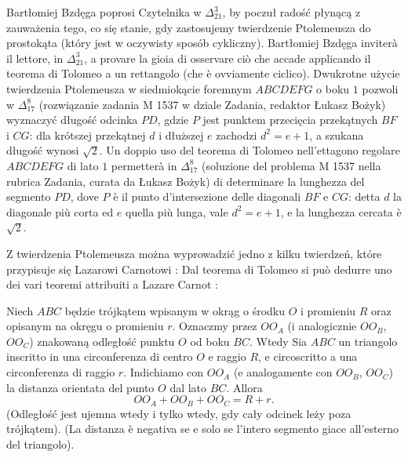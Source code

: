 Bartłomiej Bzdęga poprosi Czytelnika w $\Delta_{21}^{3}$, by poczuł radość płynącą z zauważenia tego, co się stanie, gdy zastosujemy twierdzenie Ptolemeusza do prostokąta (który jest w oczywisty sposób cykliczny). %
Bartłomiej Bzdęga inviterà il lettore, in $\Delta_{21}^{3}$, a provare la gioia di osservare ciò che accade applicando il teorema di Tolomeo a un rettangolo (che è ovviamente ciclico). %
Dwukrotne użycie twierdzenia Ptolemeusza w siedmiokącie foremnym $ABCDEFG$ o boku $1$ pozwoli w $\Delta_{17}^{8}$ (rozwiązanie zadania M 1537 w dziale Zadania, redaktor Łukasz Bożyk) wyznaczyć długość odcinka $PD$, gdzie $P$ jest punktem przecięcia przekątnych $BF$ i $CG$: dla krótszej przekątnej $d$ i dłuższej $e$ zachodzi $d^2 = e + 1$, a szukana długość wynosi $\sqrt{2}$. %
Un doppio uso del teorema di Tolomeo nell'ettagono regolare $ABCDEFG$ di lato $1$ permetterà in $\Delta_{17}^{8}$ (soluzione del problema M 1537 nella rubrica Zadania, curata da Łukasz Bożyk) di determinare la lunghezza del segmento $PD$, dove $P$ è il punto d'intersezione delle diagonali $BF$ e $CG$: detta $d$ la diagonale più corta ed $e$ quella più lunga, vale $d^2 = e + 1$, e la lunghezza cercata è $\sqrt{2}$. %

Z twierdzenia Ptolemeusza można wyprowadzić jedno z kilku twierdzeń, które przypisuje się Lazarowi Carnotowi \cite{carnot_1803}: %
Dal teorema di Tolomeo si può dedurre uno dei vari teoremi attribuiti a Lazare Carnot \cite{carnot_1803}: %
%

\begin{theorem}
[Carnota, 1803] %
[di Carnot, 1803] %
    Niech $ABC$ będzie trójkątem wpisanym w okrąg o środku $O$ i promieniu $R$ oraz opisanym na okręgu o promieniu $r$. %
    Oznaczmy przez $OO_A$ (i analogicznie $OO_B$, $OO_C$) znakowaną odległość punktu $O$ od boku $BC$. %
    Wtedy %
    Sia $ABC$ un triangolo inscritto in una circonferenza di centro $O$ e raggio $R$, e circoscritto a una circonferenza di raggio $r$. %
    Indichiamo con $OO_A$ (e analogamente con $OO_B$, $OO_C$) la distanza orientata del punto $O$ dal lato $BC$. %
    Allora %
    \begin{equation}
        OO_A + OO_B + OO_C = R + r.
    \end{equation}
    (Odległość jest ujemna wtedy i tylko wtedy, gdy cały odcinek leży poza trójkątem). %
    (La distanza è negativa se e solo se l'intero segmento giace all'esterno del triangolo). %
\end{theorem}

